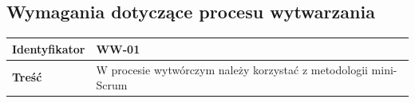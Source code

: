 \subsection{Wymagania dotyczące procesu wytwarzania}

\begin{tabular}{ | l | l | }
	\hline
		\textbf{Identyfikator} & 
	WW-01
		\\
		
	\hline
		\textbf{Treść} & \parbox[t]{13cm}{
			W procesie wytwórczym należy korzystać z metodologii
			mini-Scrum
		}\\

	\hline
\end{tabular}
